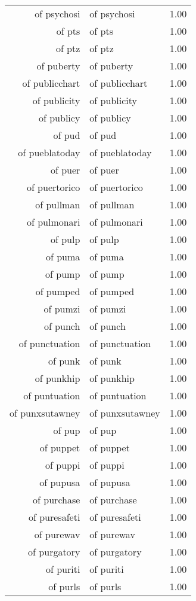 \begin{table}[ht]
\begin{tabular}{rlr}
  of psychosi & of psychosi & 1.00 \\ 
  of pts & of pts & 1.00 \\ 
  of ptz & of ptz & 1.00 \\ 
  of puberty & of puberty & 1.00 \\ 
  of publicchart & of publicchart & 1.00 \\ 
  of publicity & of publicity & 1.00 \\ 
  of publicy & of publicy & 1.00 \\ 
  of pud & of pud & 1.00 \\ 
  of pueblatoday & of pueblatoday & 1.00 \\ 
  of puer & of puer & 1.00 \\ 
  of puertorico & of puertorico & 1.00 \\ 
  of pullman & of pullman & 1.00 \\ 
  of pulmonari & of pulmonari & 1.00 \\ 
  of pulp & of pulp & 1.00 \\ 
  of puma & of puma & 1.00 \\ 
  of pump & of pump & 1.00 \\ 
  of pumped & of pumped & 1.00 \\ 
  of pumzi & of pumzi & 1.00 \\ 
  of punch & of punch & 1.00 \\ 
  of punctuation & of punctuation & 1.00 \\ 
  of punk & of punk & 1.00 \\ 
  of punkhip & of punkhip & 1.00 \\ 
  of puntuation & of puntuation & 1.00 \\ 
  of punxsutawney & of punxsutawney & 1.00 \\ 
  of pup & of pup & 1.00 \\ 
  of puppet & of puppet & 1.00 \\ 
  of puppi & of puppi & 1.00 \\ 
  of pupusa & of pupusa & 1.00 \\ 
  of purchase & of purchase & 1.00 \\ 
  of puresafeti & of puresafeti & 1.00 \\ 
  of purewav & of purewav & 1.00 \\ 
  of purgatory & of purgatory & 1.00 \\ 
  of puriti & of puriti & 1.00 \\ 
  of purls & of purls & 1.00 \\ 

\end{tabular}
\end{table}
